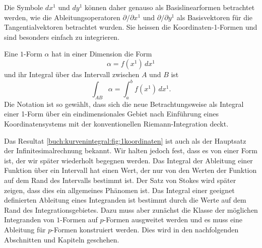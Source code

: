 Die Symbole $dx^1$ und $dy^1$ können daher genauso als Basislinearformen
betrachtet werden, wie die Ableitungsoperatoren
$\partial/\partial x^1$ und $\partial/\partial y^1$ als
Basisvektoren für die Tangentialvektoren betrachtet wurden.
Sie heissen die Koordinaten-1-Formen und sind besonders einfach
zu integrieren.

Eine $1$-Form $\alpha$ hat in einer Dimension die Form
\[
\alpha
=
f(x^1) \,dx^1
\]
und ihr Integral über das Intervall zwischen $A$ und $B$ ist
\[
\int_{AB}\alpha
=
\int_a^b f(x^1)\,dx^1.
\]
Die Notation ist so gewählt, dass sich die neue Betrachtungsweise als
Integral einer 1-Form über ein eindimensionales Gebiet nach Einführung
eines Koordinatensystems mit der konventionellen Riemann-Integration
deckt.

Das Resultat
\eqref{buch:kurvenintegral:fig:1koordinaten}
ist auch als der Hauptsatz der Infinitesimalrechnung bekannt.
Wir halten jedoch fest, dass es von einer Form ist, der wir später
wiederholt begegnen werden.
Das Integral der Ableitung einer Funktion über ein Intervall hat einen
Wert, der nur von den Werten der Funktion auf dem Rand des Intervalls
bestimmt ist.
Der Satz von Stokes wird später zeigen, dass dies ein allgemeines
Phänomen ist.
Das Integral einer geeignet definierten Ableitung eines Integranden
ist bestimmt durch die Werte auf dem Rand des Integrationsgebietes.
Dazu muss aber zunächst die Klasse der möglichen Integranden von
$1$-Formen auf $p$-Formen ausgweitet werden und es muss eine Ableitung
für $p$-Formen konstruiert werden.
Dies wird in den nachfolgenden Abschnitten und Kapiteln geschehen.

